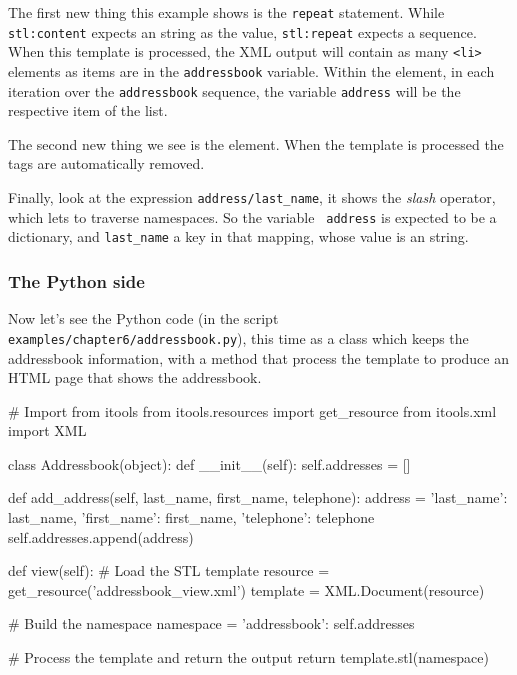 The first new thing this example shows is the {\tt repeat} statement. While
{\tt stl:content} expects an string as the value, {\tt stl:repeat} expects
a sequence. When this template is processed, the XML output will contain as
many {\tt <li>} elements as items are in the {\tt addressbook} variable.
Within the element, in each iteration over the {\tt addressbook} sequence,
the variable {\tt address} will be the respective item of the list.

The second new thing we see is the {\tt <stl:block>} element. When the
template is processed the {\tt <stl:block>} tags are automatically
removed.

Finally, look at the expression {\tt address/last\_name}, it shows the {\em
slash} operator, which lets to traverse namespaces. So the variable {\tt
address} is expected to be a dictionary, and {\tt last\_name} a key in that
mapping, whose value is an string.

\subsubsection{The Python side}

Now let's see the Python code (in the script
{\tt examples/chapter6/addressbook.py}), this time as a class which keeps
the addressbook information, with a method that process the template to
produce an HTML page that shows the addressbook.

\begin{code}
    # Import from itools
    from itools.resources import get_resource
    from itools.xml import XML


    class Addressbook(object):
        def __init__(self):
            self.addresses = []


        def add_address(self, last_name, first_name, telephone):
            address = {'last_name': last_name,
                       'first_name': first_name,
                       'telephone': telephone}
            self.addresses.append(address)


        def view(self):
            # Load the STL template
            resource = get_resource('addressbook_view.xml')
            template = XML.Document(resource)

            # Build the namespace
            namespace = {'addressbook': self.addresses}

            # Process the template and return the output
            return template.stl(namespace)
\end{code}

